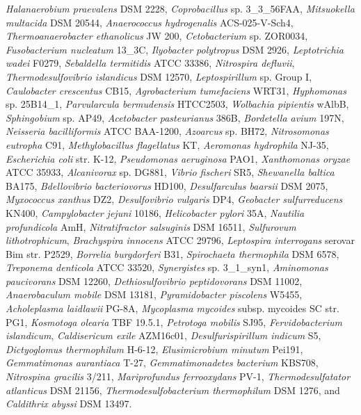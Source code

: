 \textit{Halanaerobium praevalens} DSM 2228,
\textit{Coprobacillus} sp. 3\_3\_56FAA,
\textit{Mitsuokella multacida} DSM 20544,
\textit{Anaerococcus hydrogenalis} ACS-025-V-Sch4,
\textit{Thermoanaerobacter ethanolicus} JW 200,
\textit{Cetobacterium} sp. ZOR0034,
\textit{Fusobacterium nucleatum} 13\_3C,
\textit{Ilyobacter polytropus} DSM 2926,
\textit{Leptotrichia wadei} F0279,
\textit{Sebaldella termitidis} ATCC 33386,
\textit{Nitrospira defluvii},
\textit{Thermodesulfovibrio islandicus} DSM 12570,
\textit{Leptospirillum} sp. Group I,
\textit{Caulobacter crescentus} CB15,
\textit{Agrobacterium tumefaciens} WRT31,
\textit{Hyphomonas} sp. 25B14\_1,
\textit{Parvularcula bermudensis} HTCC2503,
\textit{Wolbachia pipientis} wAlbB,
\textit{Sphingobium} sp. AP49,
\textit{Acetobacter pasteurianus} 386B,
\textit{Bordetella avium} 197N,
\textit{Neisseria bacilliformis} ATCC BAA-1200,
\textit{Azoarcus} sp. BH72,
\textit{Nitrosomonas eutropha} C91,
\textit{Methylobacillus flagellatus} KT,
\textit{Aeromonas hydrophila} NJ-35,
\textit{Escherichia coli} str. K-12,
\textit{Pseudomonas aeruginosa} PAO1,
\textit{Xanthomonas oryzae} ATCC 35933,
\textit{Alcanivorax} sp. DG881,
\textit{Vibrio fischeri} SR5,
\textit{Shewanella baltica} BA175,
\textit{Bdellovibrio bacteriovorus} HD100,
\textit{Desulfarculus baarsii} DSM 2075,
\textit{Myxococcus xanthus} DZ2,
\textit{Desulfovibrio vulgaris} DP4,
\textit{Geobacter sulfurreducens} KN400,
\textit{Campylobacter jejuni} 10186,
\textit{Helicobacter pylori} 35A,
\textit{Nautilia profundicola} AmH,
\textit{Nitratifractor salsuginis} DSM 16511,
\textit{Sulfurovum lithotrophicum},
\textit{Brachyspira innocens} ATCC 29796,
\textit{Leptospira interrogans} serovar Bim str. P2529,
\textit{Borrelia burgdorferi} B31,
\textit{Spirochaeta thermophila} DSM 6578,
\textit{Treponema denticola} ATCC 33520,
\textit{Synergistes} sp. 3\_1\_syn1,
\textit{Aminomonas paucivorans} DSM 12260,
\textit{Dethiosulfovibrio peptidovorans} DSM 11002,
\textit{Anaerobaculum mobile} DSM 13181,
\textit{Pyramidobacter piscolens} W5455,
\textit{Acholeplasma laidlawii} PG-8A,
\textit{Mycoplasma mycoides} subsp. mycoides SC str. PG1,
\textit{Kosmotoga olearia} TBF 19.5.1,
\textit{Petrotoga mobilis} SJ95,
\textit{Fervidobacterium islandicum},
\textit{Caldisericum exile} AZM16c01,
\textit{Desulfurispirillum indicum} S5,
\textit{Dictyoglomus thermophilum} H-6-12,
\textit{Elusimicrobium minutum} Pei191,
\textit{Gemmatimonas aurantiaca} T-27,
\textit{Gemmatimonadetes bacterium} KBS708,
\textit{Nitrospina gracilis} 3/211,
\textit{Mariprofundus ferrooxydans} PV-1,
\textit{Thermodesulfatator atlanticus} DSM 21156,
\textit{Thermodesulfobacterium thermophilum} DSM 1276, and
\textit{Caldithrix abyssi} DSM 13497.

